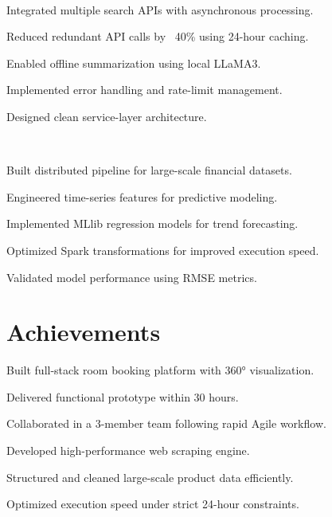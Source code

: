 \documentclass[]{plushcv}
\begin{document}
\begin{minipage}[t]{0.70\textwidth}
\\
\begin{tightemize}
\item Integrated multiple search APIs with asynchronous processing.
\item Reduced redundant API calls by ~40\% using 24-hour caching.
\item Enabled offline summarization using local LLaMA3.
\item Implemented error handling and rate-limit management.
\item Designed clean service-layer architecture.
\end{tightemize}
\vspace{4pt}

\\
\begin{tightemize}
\item Built distributed pipeline for large-scale financial datasets.
\item Engineered time-series features for predictive modeling.
\item Implemented MLlib regression models for trend forecasting.
\item Optimized Spark transformations for improved execution speed.
\item Validated model performance using RMSE metrics.
\end{tightemize}


\section{Achievements}

\begin{tightemize}
\item Built full-stack room booking platform with 360° visualization.
\item Delivered functional prototype within 30 hours.
\item Collaborated in a 3-member team following rapid Agile workflow.
\end{tightemize}

\begin{tightemize}
\item Developed high-performance web scraping engine.
\item Structured and cleaned large-scale product data efficiently.
\item Optimized execution speed under strict 24-hour constraints.
\end{tightemize}

\end{minipage}
\end{document}
